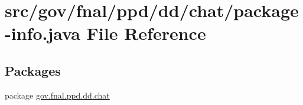 \hypertarget{gov_2fnal_2ppd_2dd_2chat_2package-info_8java}{\section{src/gov/fnal/ppd/dd/chat/package-\/info.java File Reference}
\label{gov_2fnal_2ppd_2dd_2chat_2package-info_8java}
}
\subsection*{Packages}
\begin{DoxyCompactItemize}
\item 
package \hyperlink{namespacegov_1_1fnal_1_1ppd_1_1dd_1_1chat}{gov.\-fnal.\-ppd.\-dd.\-chat}
\end{DoxyCompactItemize}
